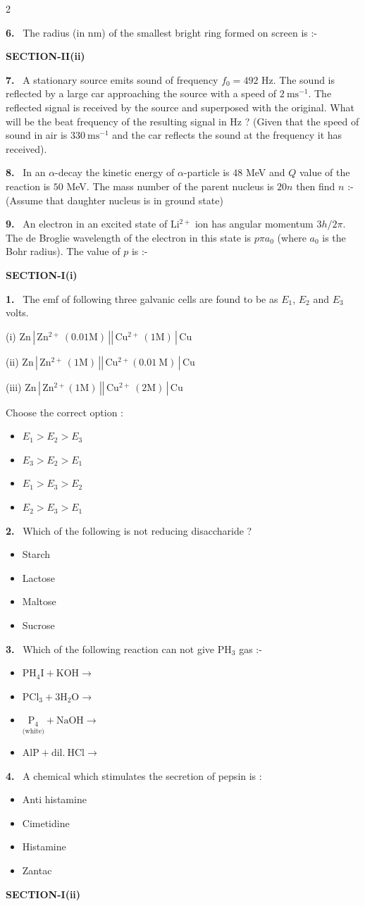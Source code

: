 \documentclass[10pt]{extarticle}
\newcommand{\partsec}[2]{\par\medskip\noindent{\large\bfseries PART-#1: #2}\par\smallskip}
\newcommand{\sect}[1]{\par\smallskip\noindent\textbf{#1}\par}
\newcommand{\qn}[1]{\par\smallskip\noindent\textbf{#1.}~}
\newenvironment{qoptions}{\begin{itemize}[leftmargin=1.8em,itemsep=1pt,topsep=2pt,label={}]}{\end{itemize}}
\newcommand{\opt}[2]{\item[(#1)] #2}
\begin{document}
\begin{multicols}{2}
\qn{6} The radius (in nm) of the smallest bright ring formed on screen is :-
\sect{SECTION-II(ii)}
\qn{7} A stationary source emits sound of frequency $f_0=492$ Hz. The sound is reflected by a large car approaching the source with a speed of $2\ \mathrm{ms^{-1}}$. The reflected signal is received by the source and superposed with the original. What will be the beat frequency of the resulting signal in Hz ? (Given that the speed of sound in air is $330\ \mathrm{ms^{-1}}$ and the car reflects the sound at the frequency it has received).
\qn{8} In an $\alpha$-decay the kinetic energy of $\alpha$-particle is $48$ MeV and $Q$ value of the reaction is $50$ MeV. The mass number of the parent nucleus is $20n$ then find $n$ :- (Assume that daughter nucleus is in ground state)
\qn{9} An electron in an excited state of $\mathrm{Li^{2+}}$ ion has angular momentum $3h/2\pi$. The de Broglie wavelength of the electron in this state is $p\pi a_0$ (where $a_0$ is the Bohr radius). The value of $p$ is :-
\partsec{2}{CHEMISTRY}
\sect{SECTION-I(i)}
\qn{1} The emf of following three galvanic cells are found to be as $E_1$, $E_2$ and $E_3$ volts.\par
(i) $\mathrm{Zn\,|\,Zn^{2+}\,(0.01M)\,||\,Cu^{2+}\,(1M)\,|\,Cu}$\par
(ii) $\mathrm{Zn\,|\,Zn^{2+}\,(1M)\,||\,Cu^{2+}(0.01\ M)\,|\,Cu}$\par
(iii) $\mathrm{Zn\,|\,Zn^{2+}(1M)\,||\,Cu^{2+}\,(2M)\,|\,Cu}$\par
Choose the correct option :
\begin{qoptions}
\opt{A}{$E_1>E_2>E_3$}
\opt{B}{$E_3>E_2>E_1$}
\opt{C}{$E_1>E_3>E_2$}
\opt{D}{$E_2>E_3>E_1$}
\end{qoptions}
\qn{2} Which of the following is not reducing disaccharide ?
\begin{qoptions}
\opt{A}{Starch}
\opt{B}{Lactose}
\opt{C}{Maltose}
\opt{D}{Sucrose}
\end{qoptions}
\qn{3} Which of the following reaction can not give $\mathrm{PH_3}$ gas :-
\begin{qoptions}
\opt{A}{$\mathrm{PH_4I+KOH\to}$}
\opt{B}{$\mathrm{PCl_3+3H_2O\to}$}
\opt{C}{$\underset{\text{(white)}}{\mathrm{P_4}}+\mathrm{NaOH}\to$}
\opt{D}{$\mathrm{AlP+dil.\ HCl\to}$}
\end{qoptions}
\qn{4} A chemical which stimulates the secretion of pepsin is :
\begin{qoptions}
\opt{A}{Anti histamine}
\opt{B}{Cimetidine}
\opt{C}{Histamine}
\opt{D}{Zantac}
\end{qoptions}
\sect{SECTION-I(ii)}

\end{multicols}
\end{document}
